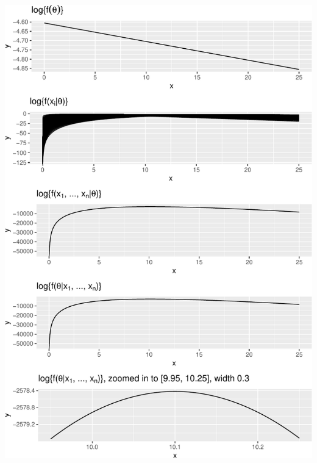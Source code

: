\documentclass[]{article}
\begin{document}
\includegraphics{20190306_log_posterior_contributions_files/figure-latex/unnamed-chunk-8-1.pdf}
\end{document}
